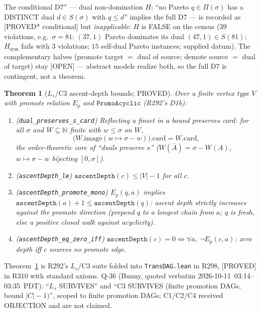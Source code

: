 \documentclass[11pt,a4paper]{article}
\newtheorem{theorem}{Theorem}
\theoremstyle{definition}
\begin{document}
The conditional D7$''$ --- dual non-domination
$H$: ``no Pareto $q\in\Pi(\sigma)$ has a DISTINCT dual
$d\in S(\sigma)$ with $q\le d$'' implies the full D7 --- is recorded as
[PROVED* conditional] but \emph{inapplicable}: $H$ is FALSE on the
census ($39$ violations, e.g.\ $\sigma=81$: $(37,1)$ Pareto dominates its
dual $(47,1)\in S(81)$; $H_{\mathrm{sym}}$ fails with $3$ violations;
$15$ self-dual Pareto instances; supplied datum). The complementary
halves (promote target $=$ dual of source; demote source $=$ dual of
target) stay [OPEN] --- abstract models realize both, so the full D7 is
contingent, not a theorem.

\begin{theorem}[$L_s$/C3 ascent-depth bounds; PROVED]
  \label{thm:ascent}
  Over a finite vertex type $V$ with promote relation $E_p$ and
  $\mathtt{PromoAcyclic}$ (R292's D1b):
  \begin{enumerate}
  \item[($L_s$)] (\texttt{dual\_preserves\_s\_card}) Reflecting a finset
    in a bound preserves card: for all $\sigma$ and
    $W\subseteq\mathbb{N}$ finite with $w\le\sigma$ on $W$,
    \begin{equation}
      \label{eq:ls}
      \bigl(W.\mathrm{image}(w\mapsto\sigma-w)\bigr).\mathrm{card}
      =W.\mathrm{card},
    \end{equation}
    the order-theoretic core of ``duals preserve $s$''
    ($W(\bar A)=\sigma-W(A)$, $w\mapsto\sigma-w$ bijecting
    $[0,\sigma]$).
  \item[(C3-i)] (\texttt{ascentDepth\_le})
    $\mathtt{ascentDepth}(c)\le|V|-1$ for all $c$.
  \item[(C3-ii)] (\texttt{ascentDepth\_promote\_mono})
    $E_p(q,a)$ implies
    $\mathtt{ascentDepth}(a)+1\le\mathtt{ascentDepth}(q)$: ascent depth
    strictly increases against the promote direction (prepend $q$ to a
    longest chain from $a$; $q$ is fresh, else a positive closed walk
    against acyclicity).
  \item[(C3-iii)] (\texttt{ascentDepth\_eq\_zero\_iff})
    $\mathtt{ascentDepth}(c)=0\iff\forall a,\ \lnot E_p(c,a)$: zero
    depth iff $c$ sources no promote edge.
  \end{enumerate}
\end{theorem}

Theorem~\ref{thm:ascent} is R292's $L_s$/C3 suite folded into
\texttt{TransDAG.lean} in R298, [PROVED] in R310 with standard axioms.
Q-36 (Bunny, quoted verbatim 2026-10-11~03:14--03:35~PDT): ``$L_s$
SURVIVES'' and ``C3 SURVIVES (finite promotion DAGs, bound
$|C|-1)$'', scoped to finite promotion DAGs; C1/C2/C4 received
OBJECTION and are not claimed.
\end{document}
